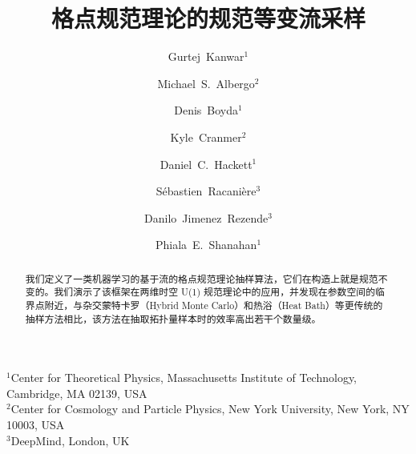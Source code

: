 \documentclass[11pt]{ctexart}
\begin{document}
\title{\bfseries 格点规范理论的规范等变流采样}
\author{Gurtej~Kanwar$^{1}$ \and Michael~S.~Albergo$^{2}$ \and Denis~Boyda$^{1}$ \and Kyle~Cranmer$^{2}$ \and
Daniel~C.~Hackett$^{1}$ \and S\'{e}bastien~Racani\`{e}re$^{3}$ \and Danilo~Jimenez~Rezende$^{3}$ \and Phiala~E.~Shanahan$^{1}$}
\date{}
\maketitle
\begin{center}\small
$^{1}$Center for Theoretical Physics, Massachusetts Institute of Technology, Cambridge, MA 02139, USA\\[1pt]
$^{2}$Center for Cosmology and Particle Physics, New York University, New York, NY 10003, USA\\[1pt]
$^{3}$DeepMind, London, UK
\end{center}

\begin{abstract}
我们定义了一类机器学习的基于流的格点规范理论抽样算法，它们在构造上就是规范不变的。我们演示了该框架在两维时空 U(1) 规范理论中的应用，并发现在参数空间的临界点附近，与杂交蒙特卡罗（Hybrid Monte Carlo）和热浴（Heat Bath）等更传统的抽样方法相比，该方法在抽取拓扑量样本时的效率高出若干个数量级。
\end{abstract}








\end{document}
